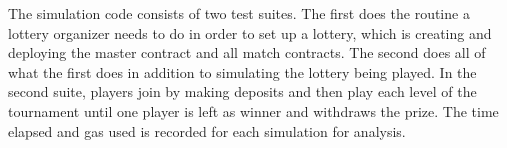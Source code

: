 The simulation code consists of two test suites. The first does the routine a lottery organizer needs to do in order to set up a lottery, which is creating and deploying the master contract and all match contracts. The second does all of what the first does in addition to simulating the lottery being played. In the second suite, players join by making deposits and then play each level of the tournament until one player is left as winner and withdraws the prize.
The time elapsed and gas used is recorded for each simulation for analysis.
